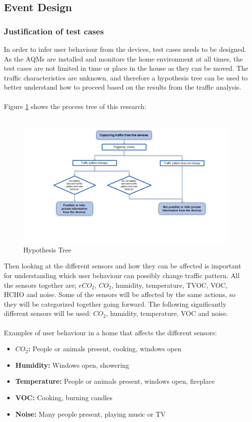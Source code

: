 \subsection{Event Design}
\subsubsection{Justification of test cases}
In order to infer user behaviour from the devices, test cases needs to be designed. As the AQMs are installed and monitors the home environment at all times, the test cases are not limited in time or place in the house as they can be moved. The traffic characteristics are unknown, and therefore a hypothesis tree can be used to better understand how to proceed based on the results from the traffic analysis. 
\\\\
Figure \ref{fig:HypothesisTree} shows the process tree of this research:
\\\\
\begin{figure} [H]
    \includegraphics[width=1.1\textwidth]{figures/HypothesisTree.png}
    \caption{Hypothesis Tree}
    \label{fig:HypothesisTree}
\end{figure}

Then looking at the different sensors and how they can be affected is important for understanding which user behaviour can possibly change traffic pattern. All the sensors together are; \(eCO_2\), \(CO_2\), humidity, temperature, TVOC, VOC, HCHO and noise. Some of the sensors will be affected by the same actions, so they will be categorized together going forward. The following significantly different sensors will be used: \(CO_2\), humidity, temperature, VOC and noise. 
\\\\
Examples of user behaviour in a home that affects the different sensors:
\begin{itemize}
    \item \textbf{\(CO_2\):} People or animals present, cooking, windows open
    \item \textbf{Humidity:} Windows open, showering
    \item \textbf{Temperature:} People or animals present, windows open, fireplace
    \item \textbf{VOC:} Cooking, burning candles
    \item \textbf{Noise:} Many people present, playing music or TV
\end{itemize}

